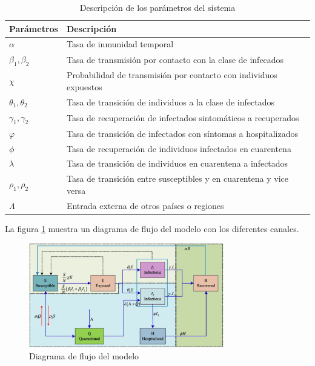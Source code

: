 \documentclass[conference]{IEEEtran}
\begin{document}
\begin{table}[h]
    \begin{tabular}{ll}
    \hline
    Parámetros            & Descripción                                                        \\ \hline
    $\alpha$              & Tasa de inmunidad temporal                                         \\ 
    $\beta_1, \beta_2$    & Tasa de transmisión por contacto con la clase de infecados         \\ 
    $\chi$                & Probabilidad de transmisión por contacto con individuos expuestos  \\ 
    $\theta_1 , \theta_2$ & Tasa de transición de individuos a la clase de infectados          \\ 
    $\gamma_1 , \gamma_2$ & Tasa de recuperación de infectados sintomáticos a recuperados      \\ 
    $\varphi$                & Tasa de transición de infectados con síntomas a hospitalizados     \\ 
    $\phi$                & Tasa de recuperación de individuos infectados en cuarentena        \\ 
    $\lambda$             & Tasa de transición de individuos en cuarentena a infectados        \\ 
    $\rho_1 , \rho_2$     & Tasa de transición entre susceptibles y en cuarentena y vice versa \\ 
    $\Lambda$             & Entrada externa de otros países o regiones                         \\ \hline
    \end{tabular}
    \caption{Descripción de los parámetros del sistema}
    \label{sys_pars}
\end{table}



La figura \ref{block_diagram} muestra un diagrama de flujo del modelo con los diferentes canales.

\begin{figure}[H]
    \centering
    \includegraphics[width=8.5cm]{../Figures/Model_flowchart.png}
    \caption{Diagrama de flujo del modelo}
    \label{block_diagram}
\end{figure}
\end{document}
